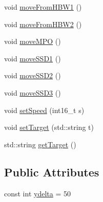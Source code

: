 \begin{DoxyCompactItemize}
void \hyperlink{classft_1_1_txt_vacuum_gripper_robot_a227472fcd152eed2388e3c3dff9cdff0}{move\+From\+H\+B\+W1} ()
\item 
void \hyperlink{classft_1_1_txt_vacuum_gripper_robot_a5d8f92545343281dfc0e443000a66aed}{move\+From\+H\+B\+W2} ()
\item 
void \hyperlink{classft_1_1_txt_vacuum_gripper_robot_a576647eda0f34a754b67196b76b1922f}{move\+M\+PO} ()
\item 
void \hyperlink{classft_1_1_txt_vacuum_gripper_robot_a4b33d1b5ddaece2aa685fe2fe4f2c174}{move\+S\+S\+D1} ()
\item 
void \hyperlink{classft_1_1_txt_vacuum_gripper_robot_a799ca9961fdeecaf7f77145d43520943}{move\+S\+S\+D2} ()
\item 
void \hyperlink{classft_1_1_txt_vacuum_gripper_robot_a49ab5533a1ebe109c6fa0d453f97ab31}{move\+S\+S\+D3} ()
\item 
void \hyperlink{classft_1_1_txt_vacuum_gripper_robot_afc2799a77d1b409aabfd76b7fa3dd7e7}{set\+Speed} (int16\+\_\+t s)
\item 
void \hyperlink{classft_1_1_txt_vacuum_gripper_robot_a6e9ffb15327bd1b83a21abd427962dde}{set\+Target} (std\+::string t)
\item 
std\+::string \hyperlink{classft_1_1_txt_vacuum_gripper_robot_a0f9f115f6c2b92a1d2678cbd1a10da64}{get\+Target} ()
\end{DoxyCompactItemize}
\subsection*{Public Attributes}
\begin{DoxyCompactItemize}
\item 
const int \hyperlink{classft_1_1_txt_vacuum_gripper_robot_a74c5b29678f0594cdfbde1637a2a9ae7}{ydelta} = 50
\end{DoxyCompactItemize}
